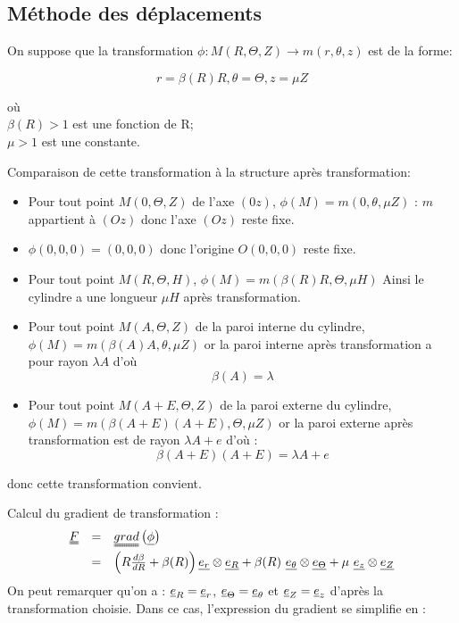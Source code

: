 \documentclass[a4paper,11pt]{article}
\newcommand{\tens}{\uuline}
\begin{document}
\subsection{Méthode des déplacements}
On suppose que la transformation $\phi : M(R,\Theta, Z) \rightarrow m(r, \theta, z)$ est de la forme:

$$r=\beta(R)R, \theta=\Theta, z=\mu Z$$

\begin{flushleft}
où\\
$\beta(R)>1$ est une fonction de R;\\
$\mu>1$ est une constante.
\end{flushleft}

Comparaison de cette transformation à la structure après transformation:
\begin{itemize}
\item Pour tout point $M(0, \Theta, Z)$ de l'axe $(0z)$, $\phi(M) = m(0, \theta, \mu Z)$ : $m$ appartient à $(Oz)$ donc l'axe $(Oz)$ reste fixe.
\item $\phi (0, 0, 0) = (0, 0, 0)$ donc l'origine $O(0, 0, 0)$ reste fixe.
\item Pour tout point $M(R, \Theta, H)$,  $\phi(M) = m(\beta (R) R, \Theta, \mu H)$ Ainsi le cylindre a une longueur $\mu H$ après transformation.
\item Pour tout point $M(A, \Theta, Z)$ de la paroi interne du cylindre, $\phi(M) = m(\beta(A) A, \theta, \mu Z)$ or la paroi interne après transformation a pour rayon $\lambda A$ d'où 
\begin{equation}
\beta(A) = \lambda
\label{eq:condition_limite_beta}
\end{equation}
\item Pour tout point $M(A+E, \Theta, Z)$ de la paroi externe du cylindre, $\phi(M) = m(\beta(A+E) (A+E), \Theta, \mu Z)$ or la paroi externe après transformation est de rayon $\lambda A + e$ d'où :
$$\beta(A+E)(A+E) = \lambda A+ e$$
\end{itemize}
donc cette transformation convient.

Calcul du gradient de transformation :
$$
\begin{array}{rcl}
\tens{F} &=& \tens{grad} \left(\uline{\phi}\right)\\
&=& \left(R\frac{d\beta}{dR} +\beta(R)\right) \uline{e_r}\otimes \uline{e_R} + \beta(R)\ \uline{e_\theta}\otimes \uline{e_\Theta} + \mu\ \uline{e_z}\otimes \uline{e_Z}
\end{array}
$$
On peut remarquer qu'on a : $\uline{e}_{R} = \uline{e}_{r}$, $\uline{e}_{\Theta} = \uline{e}_{\theta}$ et $\uline{e}_{Z} = \uline{e}_{z}$ d'après la transformation choisie. Dans ce cas, l'expression du gradient se simplifie en :
\end{document}
